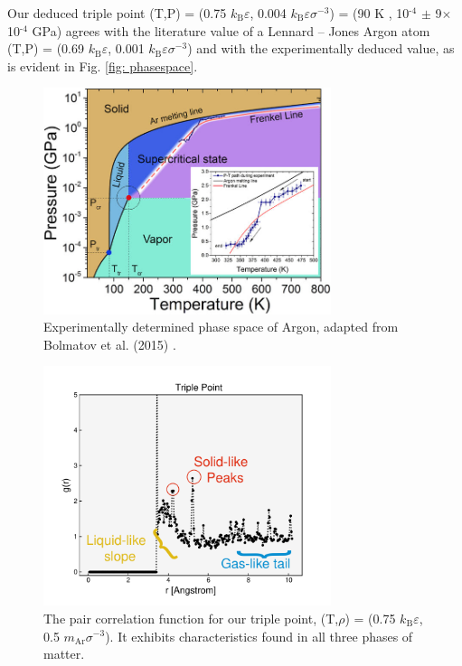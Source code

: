\documentclass{IAYCPro}
\begin{document}
Our deduced triple point (T,P) = (0.75 $k_\mathrm{B}\varepsilon$, 0.004 $k_\mathrm{B}\varepsilon \sigma^{-3}$) = (90 K , 10$^{\text{-4}}$ $\pm$ 9$\times $10$^{\text{-4}}$ GPa) agrees with the literature value \cite{triplepoint} of a Lennard -- Jones Argon atom (T,P) = (0.69 $k_\mathrm{B}\varepsilon$, 0.001 $k_\mathrm{B}\varepsilon \sigma^{-3}$) and with the experimentally deduced value, as is evident in Fig. \ref{fig: phasespace}.

\raggedbottom
\newpage

\begin{figure}[H]
    \centering
    \includegraphics[width=0.75\textwidth]{figs/phase_space.jpeg}
    \caption{Experimentally determined phase space of Argon, adapted from Bolmatov et al. (2015) \cite{phasespace}.}
    \label{fig:phasespace}
\end{figure}

\begin{figure}[H]
    \centering
    \includegraphics[width=0.75\textwidth]{figs/triple_point.pdf}
    \caption{The pair correlation function for our triple point, (T,$\rho$) = (0.75 $k_\mathrm{B}\varepsilon$, 0.5 $m_\text{Ar} \sigma^{-3}$). It exhibits characteristics found in all three phases of matter.}
    \label{fig:enter-label}
\end{figure}
\end{document}
